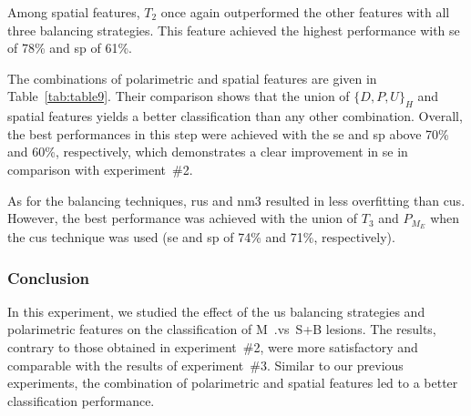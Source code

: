 Among spatial features, $T_{2}$ once again outperformed the other features with all three balancing strategies.
This feature achieved the highest performance with \ac{se} of 78\% and \ac{sp} of 61\%.

The combinations of polarimetric and spatial features are given in Table~\ref{tab:table9}.
Their comparison shows that the union of $\{D,P,U\}_{H}$ and spatial features yields a better classification than any other combination.
Overall, the best performances in this step were achieved with the \ac{se} and \ac{sp} above 70\% and 60\%, respectively, which demonstrates a clear improvement in \acl{se} in comparison with experiment~\#2.

As for the balancing techniques, \ac{rus} and \ac{nm3} resulted in less overfitting than \ac{cus}.
However, the best performance was achieved with the union of $T_{3}$ and $P_{M_{E}}$ when the \ac{cus} technique was used (\ac{se} and \ac{sp} of 74\% and 71\%, respectively).

\subsubsection{Conclusion}
In this experiment, we studied the effect of the \ac{us} balancing strategies and polarimetric features on the classification of M~.vs~S+B lesions.
The results, contrary to those obtained in experiment~\#2, were more satisfactory and comparable with the results of experiment~\#3.
Similar to our previous experiments, the combination of polarimetric and spatial features led to a better classification performance.

